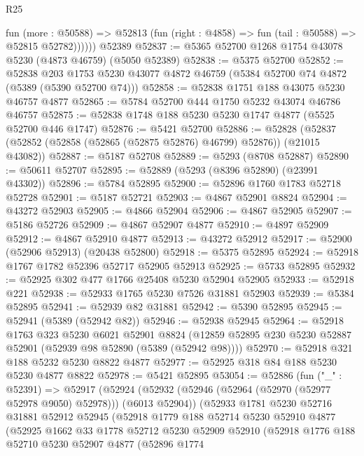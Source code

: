 \begin{lexlean}{R25}
\begin{coremodule}
            fun (more : @50588) =>
            @52813 (fun (right : @4858) => fun (tail : @50588) => @52815 @52782))))))
    @52389
@52837 := @5365 @52700 @1268 @1754 @43078 @5230 (@4873 @46759) (@5050 @52389)
@52838 := @5375 @52700
@52852 := @52838
    @203
    @1753
    @5230
    @43077
    @4872
    @46759
    (@5384 @52700 @74 @4872 (@5389 (@5390 @52700 @74)))
@52858 := @52838 @1751 @188 @43075 @5230 @46757 @4877
@52865 := @5784 @52700 @444 @1750 @5232 @43074 @46786 @46757
@52875 := @52838 @1748 @188 @5230 @5230 @1747 @4877 (@5525 @52700 @446 @1747)
@52876 := @5421 @52700
@52886 := @52828 (@52837 (@52852 (@52858 (@52865 (@52875 @52876) @46799) @52876)) (@21015 @43082))
@52887 := @5187 @52708
@52889 := @5293 (@8708 @52887)
@52890 := @50611 @52707
@52895 := @52889 (@5293 (@8396 @52890) (@23991 @43302))
@52896 := @5784 @52895
@52900 := @52896 @1760 @1783 @52718 @52728
@52901 := @5187 @52721
@52903 := @4867 @52901 @8824
@52904 := @43272 @52903
@52905 := @4866 @52904
@52906 := @4867 @52905
@52907 := @5186 @52726
@52909 := @4867 @52907 @4877
@52910 := @4897 @52909
@52912 := @4867 @52910 @4877
@52913 := @43272 @52912
@52917 := @52900 (@52906 @52913) (@20438 @52800)
@52918 := @5375 @52895
@52924 := @52918 @1767 @1782 @52396 @52717 @52905 @52913
@52925 := @5733 @52895
@52932 := @52925 @302 @477 @1766 @25408 @5230 @52904 @52905
@52933 := @52918 @221
@52938 := @52933 @1765 @5230 @7526 @31881 @52903
@52939 := @5384 @52895
@52941 := @52939 @82 @31881
@52942 := @5390 @52895
@52945 := @52941 (@5389 (@52942 @82))
@52946 := @52938 @52945
@52964 := @52918
    @1763
    @323
    @5230
    @6021
    @52901
    @8824
    (@12859 @52895 @230 @5230 @52887 @52901 (@52939 @98 @52890 (@5389 (@52942 @98))))
@52970 := @52918 @321 @188 @5232 @5230 @8822 @4877
@52977 := @52925 @318 @84 @188 @5230 @5230 @4877 @8822
@52978 := @5421 @52895
@53054 := @52886
    (fun ("_" : @52391) =>
    @52917
      (@52924
        (@52932 (@52946 (@52964 (@52970 (@52977 @52978 @9050) @52978))) (@6013 @52904))
        (@52933
          @1781
          @5230
          @52716
          @31881
          @52912
          @52945
          (@52918
            @1779
            @188
            @52714
            @5230
            @52910
            @4877
            (@52925
              @1662
              @33
              @1778
              @52712
              @5230
              @52909
              @52910
              (@52918
                @1776
                @188
                @52710
                @5230
                @52907
                @4877
                (@52896
                  @1774

\end{coremodule}
\end{lexlean}
